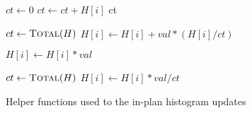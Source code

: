  \begin{algorithmic}
    
     	\State $ct \gets 0$
        		\State $ct \gets ct + H[i]$
        	\EndFor
	\Return ct
     \EndFunction
    
        	\State $ct \gets \Call{Total}{H}$
		\State $H[i] \gets H[i] +  val * (H[i] / ct)$ 
	\EndFor
    \EndFunction
    

		\State $H[i] \gets H[i] * val$ 
	\EndFor
    \EndFunction
    
        	\State $ct \gets \Call{Total}{H}$
	  	\State $H[i] \gets H[i] * val / ct$ 
	\EndFor
    \EndFunction
    
    
  \end{algorithmic}
  \caption{Helper functions used to the in-plan histogram updates}
  \label{algo:histogram-transformation-helpers}
